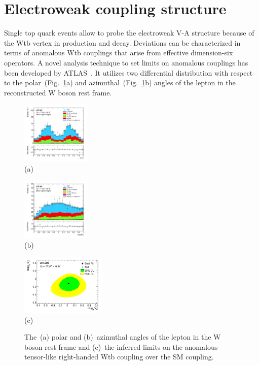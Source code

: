 \documentclass{PoS}
\begin{document}
\section{Electroweak coupling structure}
Single top quark events allow to probe the electroweak V-A structure because of the Wtb vertex in production and decay. Deviations can be characterized in terms of anomalous Wtb couplings that arise from effective dimension-six operators. A novel analysis technique to set limits on anomalous couplings has been developed by ATLAS~\cite{atlas-anomcoupl}. It utilizes two differential distribution with respect to the polar~(Fig.~\ref{fig:angles}a) and azimuthal~(Fig.~\ref{fig:angles}b) angles of the lepton in the reconstructed W boson rest frame.

\begin{figure}[htbp]
\begin{center}
\parbox[t]{0.3\textwidth}{\centering\includegraphics[width=0.29\textwidth]{atlas_anomcoupl/phi.pdf}\\(a)}
\parbox[t]{0.3\textwidth}{\centering\includegraphics[width=0.29\textwidth]{atlas_anomcoupl/theta.pdf}\\(b)}
\parbox[t]{0.38\textwidth}{\centering\includegraphics[width=0.36\textwidth]{atlas_anomcoupl/limits.pdf}\\(c)}
\end{center}
\caption{\label{fig:angles}The~(a) polar and (b)~azimuthal angles of the lepton in the W boson rest frame and (c)~the inferred limits on the anomalous tensor-like right-handed Wtb coupling over the SM coupling.}
\end{figure}
\end{document}
